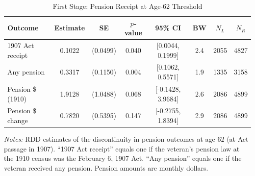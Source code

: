 \begin{table}[htbp]
\centering
\caption{First Stage: Pension Receipt at Age-62 Threshold}
\label{tab:first_stage}
\begin{tabular}{lccccccc}
\toprule
  Outcome & Estimate & SE & $p$-value & 95\% CI & BW & $N_L$ & $N_R$ \\
\midrule
  1907 Act receipt & 0.1022 & (0.0499) & 0.040 & [0.0044, 0.1999] & 2.4 & 2055 & 4827 \\
  Any pension & 0.3317 & (0.1150) & 0.004 & [0.1062, 0.5571] & 1.9 & 1335 & 3158 \\
  Pension \$ (1910) & 1.9128 & (1.0488) & 0.068 & [-0.1428, 3.9684] & 2.6 & 2086 & 4899 \\
  Pension \$ change & 0.7820 & (0.5395) & 0.147 & [-0.2755, 1.8394] & 2.9 & 2086 & 4899 \\
\bottomrule
\end{tabular}
\begin{tablenotes}[flushleft]
\small
\item \textit{Notes:} RDD estimates of the discontinuity in pension outcomes at age 62 (at Act passage in 1907). ``1907 Act receipt'' equals one if the veteran's pension law at the 1910 census was the February 6, 1907 Act. ``Any pension'' equals one if the veteran received any pension. Pension amounts are monthly dollars.
\end{tablenotes}
\end{table}
